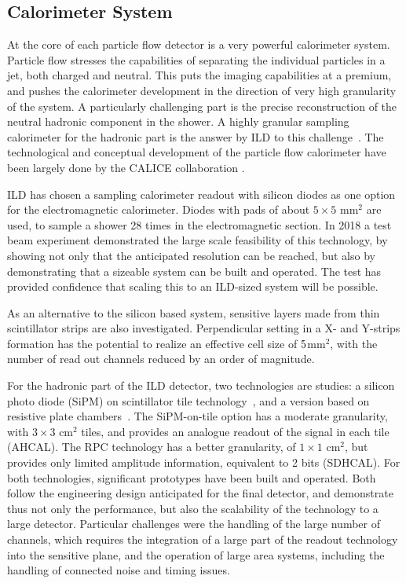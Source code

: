 \documentclass[%
 amsmath,amssymb,
 aps,
]{revtex4-1}
\begin{document}
\subsection{Calorimeter System}
At the core of each particle flow detector is a very powerful calorimeter system. Particle flow stresses the capabilities of separating the individual particles in a jet, both charged and neutral. This puts the imaging capabilities at a premium, and pushes the calorimeter development in the direction of very high granularity of the system. A particularly challenging part is the precise reconstruction of the neutral hadronic component in the shower. A highly granular sampling calorimeter for the hadronic part is the answer by ILD to this challenge~\cite{Sefkow:2015hna}. The technological and conceptual development of the particle flow calorimeter have been largely done by the CALICE collaboration \cite{bib:CALICE}. 

ILD has chosen a sampling calorimeter readout with silicon diodes as one option for the electromagnetic calorimeter. Diodes with pads of about $5 \times 5$ mm$^2$ are used, to sample a shower 28 times in the electromagnetic section. In 2018 a test beam experiment demonstrated the large scale feasibility of this technology, by showing not only that the anticipated resolution can be reached, but also by demonstrating that a sizeable system can be built and operated. The test has provided confidence that scaling this to an ILD-sized system will be possible.

As an alternative to the silicon based system, sensitive layers made from thin scintillator strips are also investigated. Perpendicular setting in a X- and Y-strips formation has the potential to realize an effective cell size of $5\time 5$mm$^2$, with the number of read out channels reduced by an order of magnitude. 

For the hadronic part of the ILD detector, two technologies are studies: a silicon photo diode (SiPM) on scintillator tile technology~\cite{Simon:2010mi}, and a version based on resistive plate chambers~\cite{Laktineh:2010zsa}. The SiPM-on-tile option has a  moderate granularity, with $3 \times 3$ cm$^2$ tiles, and provides an analogue readout of the signal in each tile (AHCAL). The RPC technology has a better granularity, of $1 \times 1$ cm$^2$, but provides only limited amplitude information, equivalent to 2 bits (SDHCAL). For both technologies, significant prototypes have been built and operated. Both follow the engineering design anticipated for the final detector, and demonstrate thus not only the performance, but also the scalability of the technology to a large detector. Particular challenges were the handling of the large number of channels, which requires the integration of a large part of the readout technology into the sensitive plane, and the operation of large area systems, including the handling of connected noise and timing issues. 
\end{document}
